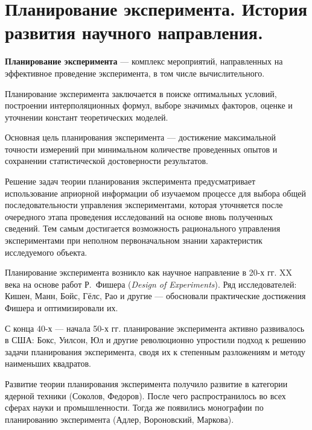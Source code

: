 \section{Планирование эксперимента. История развития научного направления.}

\textbf{Планирование эксперимента} — комплекс мероприятий, направленных на эффективное проведение эксперимента, в том числе вычислительного.

Планирование эксперимента заключается в поиске оптимальных условий, построении интерполяционных формул, выборе значимых факторов, оценке и уточнении констант теоретических моделей.

Основная цель планирования эксперимента — достижение максимальной точности измерений при минимальном количестве проведенных опытов и сохранении статистической достоверности результатов.

Решение задач теории планирования эксперимента предусматривает использование априорной информации об изучаемом процессе для выбора общей последовательности управления экспериментами, которая уточняется после очередного этапа проведения исследований на основе вновь полученных сведений. Тем самым достигается возможность рационального управления экспериментами при неполном первоначальном знании характеристик исследуемого объекта.

Планирование эксперимента возникло как научное направление в 20-х гг. XX века на основе работ Р.~Фишера (\emph{Design of Experiments}). Ряд исследователей: Кишен, Манн, Бойс, Гёлс, Рао и другие — обосновали практические достижения Фишера и оптимизировали их.

С конца 40-х — начала 50-х гг. планирование эксперимента активно развивалось в США: Бокс, Уилсон, Юл и другие революционно упростили подход к решению задачи планирования эксперимента, сводя их к степенным разложениям и методу наименьших квадратов.

Развитие теории планирования эксперимента получило развитие в категории ядерной техники (Соколов, Федоров). После чего распространилось во всех сферах науки и промышленности. Тогда же появились монографии по планированию эксперимента (Адлер, Вороновский, Маркова).

\clearpage
